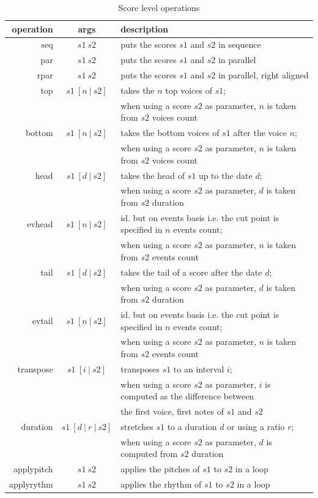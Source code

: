 \documentclass[twoside,10pt,a4paper]{article}
\begin{document}
\begin{table}[htdp]
\begin{center}
\begin{tabular}{rcl}
\hline
operation & args		&	description \\
\hline
seq 	&	$s1\ s2$		& puts the scores $s1$ and $s2$ in sequence \\
par 	&	$s1\ s2$		& puts the scores $s1$ and $s2$ in parallel \\ 
rpar	&	$s1\ s2$		& puts the scores $s1$ and $s2$ in parallel, right aligned \\
top 	&	$s1\ [n\ | \ s2]$ 	& takes the $n$ top voices of $s1$; \\
		&	& when using a score $s2$ as parameter, $n$ is taken from $s2$ voices count \\
bottom 	&	$s1\ [n\ | \ s2]$ 	& takes the bottom voices of $s1$ after the voice $n$;  \\
		&	& when using a score $s2$ as parameter, $n$ is taken from $s2$ voices count \\
head	& 	$s1\ [d\ | \ s2]$	& takes the head of $s1$ up to the date $d$; \\
		& 	& when using a score $s2$ as parameter, $d$ is taken from $s2$ duration \\
evhead 	&	$s1\ [n\ | \ s2]$	& id. but on events basis i.e. the cut point is specified in $n$ events count; \\
		& 	& when using a score $s2$ as parameter, $n$ is taken from $s2$ events count \\
tail	&	$s1\ [d\ | \ s2]$ 	& takes the tail of a score after the date $d$; \\
		& 	& when using a score $s2$ as parameter, $d$ is taken from $s2$ duration \\
evtail 	&	$s1\ [n\ | \ s2]$ 	& id. but on events basis i.e. the cut point is specified in $n$ events count; \\
		& 	& when using a score $s2$ as parameter, $n$ is taken from $s2$ events count \\
transpose 	&	$s1\ [i\ | \ s2]$	& transposes $s1$ to an interval $i$; \\
			& 	& when using a score $s2$ as parameter, $i$ is computed as the difference between \\
			& 	& the first voice, first notes of $s1$ and $s2$ \\
duration 	&	$s1\ [d\ |\ r\ |\ s2]$	& stretches $s1$ to a duration $d$ or using a ratio $r$; \\
			& 	& when using a score $s2$ as parameter, $d$ is computed from $s2$ duration \\
applypitch 	&	$s1\ s2$	& applies the pitches of $s1$ to $s2$ in a loop \\
applyrythm 	&	$s1\ s2$	& applies the rhythm of $s1$ to $s2$ in a loop \\
\hline
\end{tabular}
\end{center}
\caption{Score level operations}
\label{operations}
\end{table}
\end{document}
